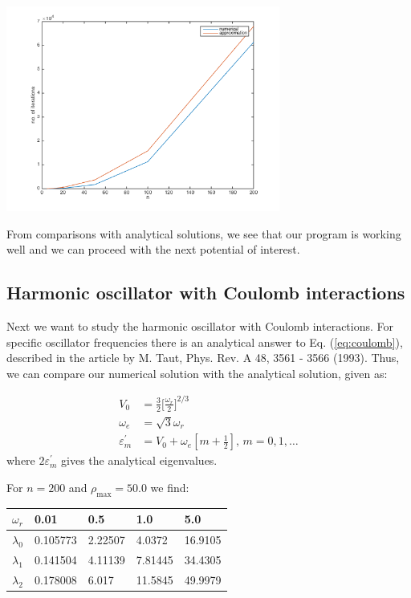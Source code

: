 \documentclass{article}
\begin{document}
\begin{multicols}{2}
\begin{center}
	\includegraphics[width=90mm]{../build-Project2-Desktop_Qt_5_5_0_clang_64bit-Debug/iterations.png} 	
	\label{fig:iterations}
\end{center}
From comparisons with analytical solutions, we see that our program is working well and we can proceed with the next potential of interest.



\subsection{Harmonic oscillator with Coulomb interactions}
Next we want to study the harmonic oscillator with Coulomb interactions. For specific oscillator frequencies there is an analytical answer to Eq. (\ref{eq:coulomb}), described in the article by M. Taut, Phys. Rev. A 48, 3561 - 3566 (1993). Thus, we can compare our numerical solution with the analytical solution, given as:

\begin{equation}\label{eq:analytical}
\begin{aligned}
	V_0 &= \frac{3}{2} \bigg[ \frac{\omega_r}{2} \bigg]^{2/3} \\
	\omega_e &= \sqrt{3} \omega_r \\
	\varepsilon_m^{'} &= V_0 + \omega_e [m + \frac{1}{2}] \textrm{,       } m = 0,1, \dots
\end{aligned}
\end{equation}
where $2\varepsilon_m^{'}$ gives the analytical eigenvalues.

For $n = 200$ and $\rho_{\textrm{max}} = 50.0$ we find:

\begin{center}
\begin{tabular}{ l l l l l }\hline
	$\omega_r$ 	& 0.01		& 0.5		& 1.0	&5.0\\ \hline
	$\lambda_0$ 	& 0.105773	& 2.22507		& 4.0372	& 16.9105\\
	$\lambda_1$ 	& 0.141504	& 4.11139		& 7.81445	& 34.4305 \\
	$\lambda_2$ 	& 0.178008	& 6.017		& 11.5845	& 49.9979\\
	\hline
\end{tabular}
\end{center}


\end{multicols}
\end{document}
